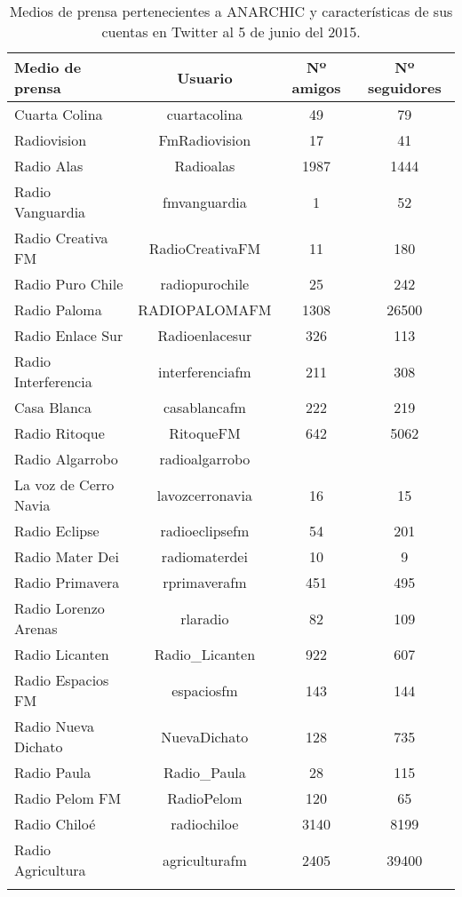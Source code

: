 \begin{center}
	\centering
	\begin{longtable}{| l | c | c | c |}
		
		\hline
			Medio de prensa    & Usuario  & Nº amigos & Nº seguidores \\ \hline	
			Cuarta Colina	&	cuartacolina	&	49	&	79	\\ \hline
			Radiovision	&	FmRadiovision	&	17	&	41	\\ \hline
			Radio Alas	&	Radioalas	&	1987	&	1444	\\ \hline
			Radio Vanguardia	&	fmvanguardia	&	1	&	52	\\ \hline
			Radio Creativa FM	&	RadioCreativaFM	&	11	&	180	\\ \hline
			Radio Puro Chile	&	radiopurochile	&	25	&	242	\\ \hline
			Radio Paloma	&	RADIOPALOMAFM	&	1308	&	26500	\\ \hline
			Radio Enlace Sur	&	Radioenlacesur	&	326	&	113	\\ \hline
			Radio Interferencia	&	interferenciafm	&	211	&	308	\\ \hline
			Casa Blanca	&	casablancafm	&	222	&	219	\\ \hline
			Radio Ritoque	&	RitoqueFM	&	642	&	5062	\\ \hline
			Radio Algarrobo	&	radioalgarrobo	&		&		\\ \hline
			La voz de Cerro Navia	&	lavozcerronavia	&	16	&	15	\\ \hline
			Radio Eclipse	&	radioeclipsefm	&	54	&	201	\\ \hline
			Radio Mater Dei	&	radiomaterdei	&	10	&	9	\\ \hline
			Radio Primavera	&	rprimaverafm	&	451	&	495	\\ \hline
			Radio Lorenzo Arenas	&	rlaradio	&	82	&	109	\\ \hline
			Radio Licanten	&	Radio\_Licanten	&	922	&	607	\\ \hline
			Radio Espacios FM	&	espaciosfm	&	143	&	144	\\ \hline
			Radio Nueva Dichato	&	NuevaDichato	&	128	&	735	\\ \hline
			Radio Paula	&	Radio\_Paula	&	28	&	115	\\ \hline
			Radio Pelom FM	&	RadioPelom	&	120	&	65	\\ \hline
			Radio Chiloé	&	radiochiloe	&	3140	&	8199	\\ \hline
			Radio Agricultura	&	agriculturafm	&	2405	&	39400	\\ \hline
			
		\caption {Medios de prensa pertenecientes a ANARCHIC y características de sus cuentas en Twitter al 5 de junio del 2015.}
		
	\end{longtable}
\end{center}

